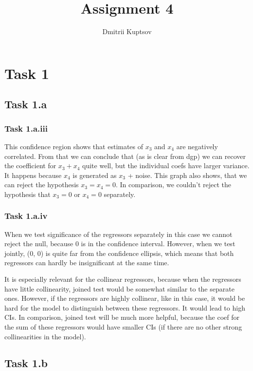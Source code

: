 \documentclass[12pt]{article}
\title{Assignment 4}
\author{Dmitrii Kuptsov}
\begin{document}
\maketitle
\section*{Task 1}

\subsection*{Task 1.a}

\subsubsection*{Task 1.a.iii}

This confidence region shows that estimates of $x_3$ and $x_4$ are negatively correlated. From that we can conclude that (as is clear from dgp) we can recover the coefficient for $x_3 + x_4$ quite well, but the individual coefs have larger variance. It happens because $x_4$ is generated as $x_3$ + noise. This graph also shows, that we can reject the hypothesis $x_3 = x_4 = 0$. In comparison, we couldn't reject the hypothesis that $x_3 = 0$ or $x_4 = 0$ separately.

\subsubsection*{Task 1.a.iv}

When we test significance of the regressors separately in this case we cannot reject the null, because 0 is in the confidence interval. However, when we test jointly, (0, 0) is quite far from the confidence ellipsis, which means that both regressors can hardly be insignificant at the same time.

It is especially relevant for the collinear regressors, because when the regressors have little collinearity, joined test would be somewhat similar to the separate ones. However, if the regressors are highly collinear, like in this case, it would be hard for the model to distinguish between these regressors. It would lead to high CIs. In comparison, joined test will be much more helpful, because the coef for the sum of these regressors would have smaller CIs (if there are no other strong collinearities in the model).

\subsection*{Task 1.b}
\end{document}
